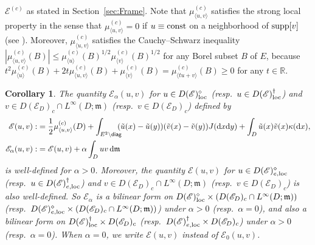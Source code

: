 \documentclass[12pt,a4paper]{article}
\newtheorem{cor}[thm]{Corollary}
\newcommand{\R}{\mathbb{R}}
\renewcommand{\d}{\mathrm{d}}
\newcommand{\m}{\mathfrak{m} }
\newcommand{\loc}{{\rm loc}}
\newcommand{\1}{{\bf 1}}
\begin{document}
$\mathscr{E}^{(c)}$ as stated in Section~\ref{sec:Frame}. 
Note that $\mu_{\langle u,v\rangle}^{(c)}$ satisfies 
the strong local property in the sense that 
$\mu_{\langle u,v\rangle}^{(c)}=0$ if $u\equiv{\rm const}$ on a 
neighborhood of ${\rm supp}[v]$ (see \cite[Lemma~5.2 ($\Gamma 6$)]{Kw:func}). Moreover, $\mu_{\langle u,v\rangle}^{(c)}$ 
satisfies the Cauchy--Schwarz inequality 
$|\mu_{\langle u,v\rangle}^{(c)}(B)|\leq \mu_{\langle u\rangle}^{(c)}(B)^{1/2}\mu_{\langle v\rangle}^{(c)}(B)^{1/2}$ for any Borel subset $B$ of $E$, because $t^2\mu_{\langle u\rangle}^{(c)}(B)+2t\mu_{\langle u,v\rangle}^{(c)}(B)+\mu_{\langle v\rangle}^{(c)}(B)
=\mu_{\langle tu+v\rangle}^{(c)}(B)\geq0$ for any $t\in\R$. 
\begin{cor}\label{cor:welldefinedenergy}
The quantity $\mathscr{E}_{\alpha}(u,v)$ for $u\in 
D(\mathscr{E})_{\loc}^{\diamond}$ {\rm(}resp.~$u\in 
D(\mathscr{E})_{\loc}^{\dag}${\rm )}
and 
$v\in D(\mathscr{E}_D)_c\cap L^{\infty}(D;{\m})$ 
{\rm(}resp.~$v\in D(\mathscr{E}_D)_c${\rm)}
defined by 
\begin{align*}
\mathscr{E}(u,v):&=\frac12\mu^{(c)}_{\langle u,v\rangle}(D)+\int_{E^2\setminus {\sf diag}}
\hspace{-0.2cm}
(\tilde{u}(x)-\tilde{u}(y))(\tilde{v}(x)-\tilde{v}(y))J({\d} x{\d} y)+\int_D\tilde{u}(x)\tilde{v}(x)\kappa({\d} x),\\
\mathscr{E}_{\alpha}(u,v):&=\mathscr{E}(u,v)+\alpha\int_Duv\,{\d}{\m}
\end{align*}
is well-defined for $\alpha>0$.  
Moreover, the quantity $\mathscr{E}(u,v)$ for $u\in
D(\mathscr{E})_{e,\loc}^{\diamond}$ 
{\rm(}resp.~$u\in
D(\mathscr{E})_{e,\loc}^{\dag}${\rm)}
and 
$v\in D(\mathscr{E}_D)_c\cap L^{\infty}(D;{\m})$ 
{\rm(}resp.~$v\in D(\mathscr{E}_D)_c${\rm)} is also well-defined.
So $\mathscr{E}_{\alpha}$ is a bilinear form on 
$D(\mathscr{E})_{\loc}^{\diamond}\times (D(\mathscr{E}_D)_c\cap L^{\infty}(D;{\m}))$ {\rm(}resp.~$D(\mathscr{E})_{e,\loc}^{\diamond}\times (D(\mathscr{E}_D)_c\cap L^{\infty}(D;{\m}))${\rm)} under $\alpha>0$ {\rm(}resp.~$\alpha=0${\rm)}, and 
 also a bilinear form on $D(\mathscr{E})_{\loc}^{\dag}\times D(\mathscr{E}_D)_c$ {\rm(}resp.~$D(\mathscr{E})_{e,\loc}^{\dag}\times D(\mathscr{E}_D)_c${\rm)} under $\alpha>0$ {\rm(}resp.~$\alpha=0${\rm)}.
When $\alpha=0$, we write $\mathscr{E}(u,v)$ instead of $\mathscr{E}_0(u,v)$.
\end{cor}
\end{document}
